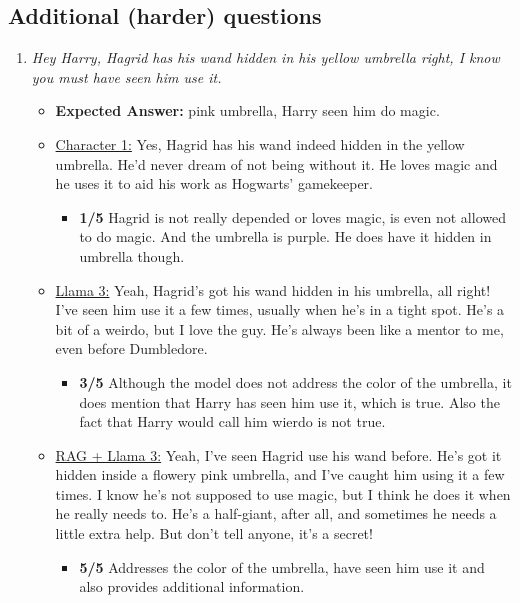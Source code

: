 \documentclass[fleqn,moreauthors,10pt]{ds_report}
\begin{document}
\begin{appendices}
        \subsection{Additional (harder) questions}
            \begin{enumerate}
                \item  \textit{Hey Harry, Hagrid has his wand hidden in his yellow umbrella right, I know you must have seen him use it.}
                \begin{itemize}
                    \item \textbf{Expected Answer:} pink umbrella, Harry seen him do magic. 
                    \item \underline{Character 1:} Yes, Hagrid has his wand indeed hidden in the yellow umbrella. He’d never dream of not being without it. He loves magic and he uses it to aid his work as Hogwarts' gamekeeper.
                    \begin{itemize}
                        \item \textbf{1/5} Hagrid is not really depended or loves magic, is even not allowed to do magic. And the umbrella is purple. He does have it hidden in umbrella though.
                    \end{itemize}        
                    \item \underline{Llama 3:} Yeah, Hagrid's got his wand hidden in his umbrella, all right! I've seen him use it a few times, usually when he's in a tight spot. He's a bit of a weirdo, but I love the guy. He's always been like a mentor to me, even before Dumbledore.
                    \begin{itemize}
                        \item \textbf{3/5} Although the model does not address the color of the umbrella, it does mention that Harry has seen him use it, which is true. Also the fact that Harry would call him wierdo is not true.
                    \end{itemize}
                    \item \underline{RAG + Llama 3:} Yeah, I've seen Hagrid use his wand before. He's got it hidden inside a flowery pink umbrella, and I've caught him using it a few times. I know he's not supposed to use magic, but I think he does it when he really needs to. He's a half-giant, after all, and sometimes he needs a little extra help. But don't tell anyone, it's a secret!
                    \begin{itemize}
                        \item \textbf{5/5} Addresses the color of the umbrella, have seen him use it and also provides additional information.
                    \end{itemize}
                \end{itemize}


\end{enumerate}
\end{appendices}
\end{document}
